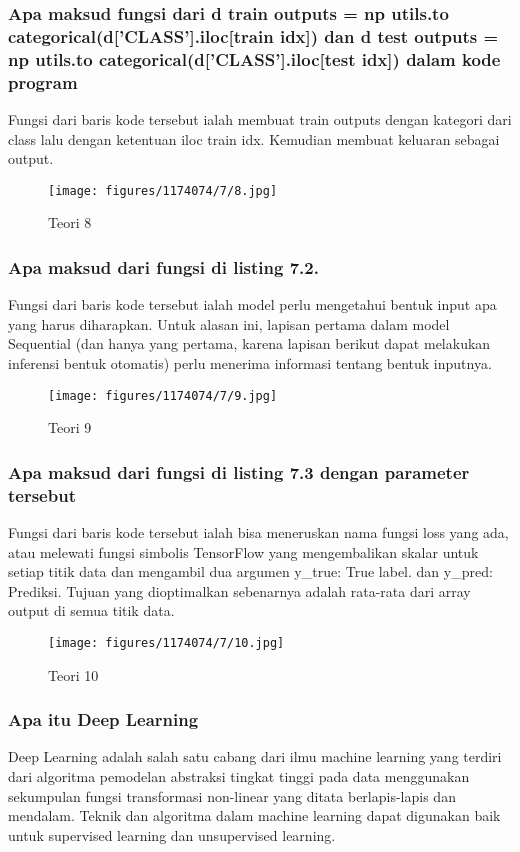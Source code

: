 \subsubsection{Apa maksud fungsi dari d train outputs = np utils.to categorical(d[’CLASS’].iloc[train idx]) dan d test outputs = np utils.to categorical(d[’CLASS’].iloc[test idx]) dalam kode program}
\hfill\break
Fungsi dari baris kode tersebut ialah membuat train outputs dengan kategori dari class lalu dengan ketentuan iloc train idx. Kemudian membuat keluaran sebagai output.
\begin{figure}[H]
\centering
	\texttt{[image: figures/1174074/7/8.jpg]}
\caption{Teori 8}
\end{figure}

\subsubsection{Apa maksud dari fungsi di listing 7.2.}
\hfill\break

Fungsi dari baris kode tersebut ialah model perlu mengetahui bentuk input apa yang harus diharapkan. Untuk alasan ini, lapisan pertama dalam model Sequential (dan hanya yang pertama, karena lapisan berikut dapat melakukan inferensi bentuk otomatis) perlu menerima informasi tentang bentuk inputnya.
\begin{figure}[H]
\centering
	\texttt{[image: figures/1174074/7/9.jpg]}
\caption{Teori 9}
\end{figure}

\subsubsection{Apa maksud dari fungsi di listing 7.3 dengan parameter tersebut}
\hfill\break

Fungsi dari baris kode tersebut ialah bisa meneruskan nama fungsi loss yang ada, atau melewati fungsi simbolis TensorFlow yang mengembalikan skalar untuk setiap titik data dan mengambil dua argumen y\_true: True label. dan  y\_pred: Prediksi. Tujuan yang dioptimalkan sebenarnya adalah rata-rata dari array output di semua titik data.
\begin{figure}[H]
\centering
	\texttt{[image: figures/1174074/7/10.jpg]}
\caption{Teori 10}
\end{figure}

\subsubsection{Apa itu Deep Learning}
\hfill\break
Deep Learning adalah salah satu cabang dari ilmu machine learning yang terdiri dari algoritma pemodelan abstraksi tingkat tinggi pada data menggunakan sekumpulan fungsi transformasi non-linear yang ditata berlapis-lapis dan mendalam. Teknik dan algoritma dalam machine learning dapat digunakan baik untuk supervised learning dan unsupervised learning.


